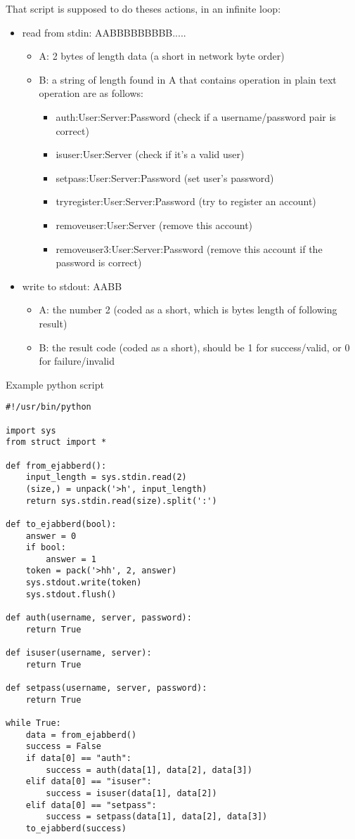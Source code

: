 \documentclass[a4paper,10pt]{article}
\begin{document}
That script is supposed to do theses actions, in an infinite loop:
\begin{itemize}
\item read from stdin: AABBBBBBBBB.....
    \begin{itemize}
    \item A: 2 bytes of length data (a short in network byte order)
    \item B: a string of length found in A that contains operation in plain text
    operation are as follows:
    \begin{itemize}
    \item auth:User:Server:Password (check if a username/password pair is correct)
    \item isuser:User:Server (check if it's a valid user)
    \item setpass:User:Server:Password (set user's password)
    \item tryregister:User:Server:Password (try to register an account)
    \item removeuser:User:Server (remove this account)
    \item removeuser3:User:Server:Password (remove this account if the password is correct)
    \end{itemize}
    \end{itemize}
\item write to stdout: AABB
    \begin{itemize}
    \item A: the number 2 (coded as a short, which is bytes length of following result)
    \item B: the result code (coded as a short), should be 1 for success/valid, or 0 for failure/invalid
    \end{itemize}
\end{itemize}

Example python script
\begin{verbatim}
#!/usr/bin/python

import sys
from struct import *

def from_ejabberd():
    input_length = sys.stdin.read(2)
    (size,) = unpack('>h', input_length)
    return sys.stdin.read(size).split(':')

def to_ejabberd(bool):
    answer = 0
    if bool:
        answer = 1
    token = pack('>hh', 2, answer)
    sys.stdout.write(token)
    sys.stdout.flush()

def auth(username, server, password):
    return True

def isuser(username, server):
    return True

def setpass(username, server, password):
    return True

while True:
    data = from_ejabberd()
    success = False
    if data[0] == "auth":
        success = auth(data[1], data[2], data[3])
    elif data[0] == "isuser":
        success = isuser(data[1], data[2])
    elif data[0] == "setpass":
        success = setpass(data[1], data[2], data[3])
    to_ejabberd(success)
\end{verbatim}
\end{document}
